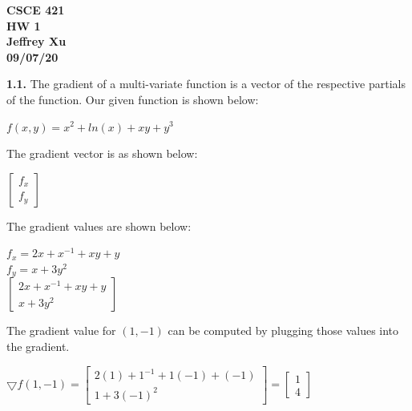 \documentclass[12pt]{article}
\begin{document}
\begin{center}

{\bf
CSCE 421\\
HW 1\\
Jeffrey Xu\\
09/07/20\\
}

\end{center}

{\bf 1.1.} The gradient of a multi-variate function is a vector of the respective partials of the function. Our given function is shown below:

\begin{center}

$f(x,y)=x^{2}+ln(x)+xy+y^{3}$\\

\end{center}

The gradient vector is as shown below:

\begin{center}

$\begin{bmatrix}
f_{x}\\
f_{y}
\end{bmatrix}
$\\

\end{center}

The gradient values are shown below:

\begin{center}

$f_{x}=2x+x^{-1}+xy+y$\\
\bigskip
$f_{y}=x+3y^{2}$\\
\bigskip
$
\begin{bmatrix}
2x+x^{-1}+xy+y\\
x+3y^{2}
\end{bmatrix}
$
\end{center}

The gradient value for $(1,-1)$ can be computed by plugging those values into the gradient.

\begin{center}

$
\bigtriangledown f(1,-1)=
\begin{bmatrix}
2(1)+1^{-1}+1(-1)+(-1)\\
1+3(-1)^{2}
\end{bmatrix}=
\begin{bmatrix}
1\\
4
\end{bmatrix}
$

\end{center}
\end{document}
